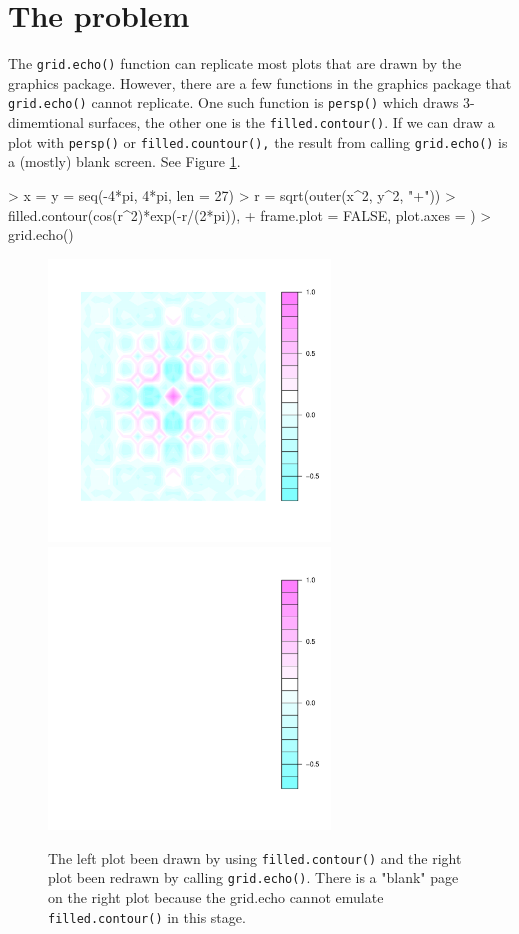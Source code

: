 \documentclass[paper=a4, fontsize=11pt]{report}
\begin{document}
\section{The problem}
The \texttt{grid.echo()} function can replicate most plots that are drawn by the graphics package. However, there are a few functions in the graphics package that \texttt{grid.echo()} cannot replicate. One such function is \texttt{persp()} which draws 3-dimemtional surfaces, the other one is the \texttt{filled.contour()}. If we can draw a plot with \texttt{persp()} or \texttt{filled.countour(),} the result from calling \texttt{grid.echo()} is a (mostly) blank screen. See Figure \ref{figure_1.3}.
\begin{Schunk}
\begin{Sinput}
> x = y = seq(-4*pi, 4*pi, len = 27)
> r = sqrt(outer(x^2, y^2, "+"))
> filled.contour(cos(r^2)*exp(-r/(2*pi)), 
+                frame.plot = FALSE, plot.axes = {})
> grid.echo()
\end{Sinput}
\end{Schunk}
\begin{figure}[h]
	\begin{center}
		\includegraphics[height = 7.5cm, width = 7.5cm]{figure/report_fill_1}
		\includegraphics[height = 7.5cm, width = 7.5cm]{figure/report_fill_2}
		\caption{The left plot been drawn by using \texttt{filled.contour()} and the right plot been redrawn by calling \texttt{grid.echo()}. There is a "blank" page on the right plot because the grid.echo cannot emulate \texttt{filled.contour()} in this stage.}
		\label{figure_1.3}
	\end{center}
\end{figure}
\end{document}

